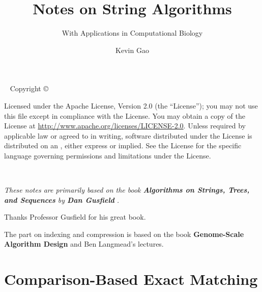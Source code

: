 \documentclass[nobib]{tufte-book}
\title{Notes on String Algorithms}
\subtitle{With Applications in Computational Biology}
\author{Kevin Gao}
\begin{document}
\frontmatter



\maketitle


\newpage
\begin{fullwidth}
~\vfill
\thispagestyle{empty}
\setlength{\parindent}{0pt}
\setlength{\parskip}{\baselineskip}
Copyright \copyright\ \the\year\ \thanklessauthor

\par{}

\par Licensed under the Apache License, Version 2.0 (the ``License''); you may not
use this file except in compliance with the License. You may obtain a copy
of the License at \url{http://www.apache.org/licenses/LICENSE-2.0}. Unless
required by applicable law or agreed to in writing, software distributed
under the License is distributed on an , either express or implied. See the
License for the specific language governing permissions and limitations
under the License.


\end{fullwidth}

\tableofcontents

\cleardoublepage
~\vfill

{\noindent\fontsize{18}{22}\selectfont\itshape
These notes are primarily based on the book \textbf{Algorithms on Strings, Trees, and Sequences} by \textbf{Dan Gusfield} \cite{gusfield_1997}.

\hfill

\noindent Thanks Professor Gusfield for his great book.

\hfill

The part on indexing and compression is based on the book \textbf{Genome-Scale Algorithm Design} \cite{makinen_belazzougui_cunial_tomescu_2015} and Ben Langmead's lectures.
}

\vfill
\vfill


\cleardoublepage


\mainmatter

\part{Comparison-Based Exact Matching}
\end{document}

